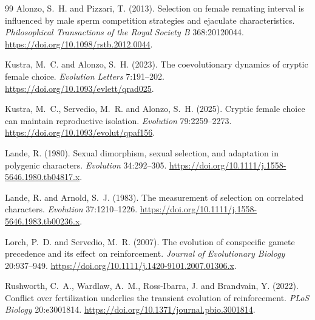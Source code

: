 \documentclass[11pt,a4paper]{article}
\begin{document}
\begin{thebibliography}{99}
Alonzo, S.~H. and Pizzari, T. (2013). Selection on female remating interval is influenced by male sperm competition strategies and ejaculate characteristics. \emph{Philosophical Transactions of the Royal Society B} 368:20120044. \url{https://doi.org/10.1098/rstb.2012.0044}.

Kustra, M.~C. and Alonzo, S.~H. (2023). The coevolutionary dynamics of cryptic female choice. \emph{Evolution Letters} 7:191--202. \url{https://doi.org/10.1093/evlett/qrad025}.

Kustra, M.~C., Servedio, M.~R. and Alonzo, S.~H. (2025). Cryptic female choice can maintain reproductive isolation. \emph{Evolution} 79:2259--2273. \url{https://doi.org/10.1093/evolut/qpaf156}.

Lande, R. (1980). Sexual dimorphism, sexual selection, and adaptation in polygenic characters. \emph{Evolution} 34:292--305. \url{https://doi.org/10.1111/j.1558-5646.1980.tb04817.x}.

Lande, R. and Arnold, S.~J. (1983). The measurement of selection on correlated characters. \emph{Evolution} 37:1210--1226. \url{https://doi.org/10.1111/j.1558-5646.1983.tb00236.x}.

Lorch, P.~D. and Servedio, M.~R. (2007). The evolution of conspecific gamete precedence and its effect on reinforcement. \emph{Journal of Evolutionary Biology} 20:937--949. \url{https://doi.org/10.1111/j.1420-9101.2007.01306.x}.

Rushworth, C.~A., Wardlaw, A.~M., Ross-Ibarra, J. and Brandvain, Y. (2022). Conflict over fertilization underlies the transient evolution of reinforcement. \emph{PLoS Biology} 20:e3001814. \url{https://doi.org/10.1371/journal.pbio.3001814}.
\end{thebibliography}
\end{document}
